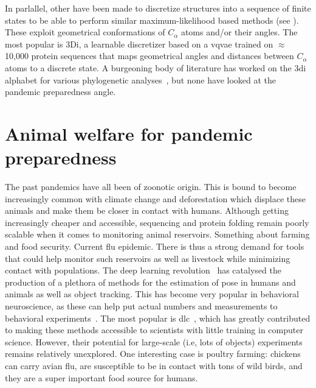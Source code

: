 In parlallel, other have been made to discretize structures into a sequence of finite states to be able to perform similar maximum-likelihood based methods (see ). These exploit geometrical conformations of $C_\alpha$ atoms and/or their angles. The most popular is 3Di, a learnable discretizer based on a \gls{vqvae} trained on $\approx$ 10,000 protein sequences that maps geometrical angles and distances between $C_\alpha$ atoms to a discrete state. A burgeoning body of literature has worked on the 3di alphabet for various phylogenetic analyses~\cite{moi2023, puente2023}, but none have looked at the pandemic preparedness angle.


\section{Animal welfare for pandemic preparedness}

The past pandemics have all been of zoonotic origin. This is bound to become increasingly common with climate change and deforestation which displace these animals and make them be closer in contact with humans. Although getting increasingly cheaper and accessible, sequencing and protein folding remain poorly scalable when it comes to monitoring animal reservoirs. Something about farming and food security. Current flu epidemic. There is thus a strong demand for tools that could help monitor such reservoirs as well as livestock while minimizing contact with populations. The deep learning revolution~\cite{lecun2015} has catalysed the production of a plethora of methods for the estimation of pose in humans and animals as well as object tracking. This has become very popular in behavioral neuroscience, as these can help put actual numbers and measurements to behavioral experiments~\cite{mathis2018, graving2019, gunel2019, pereira2022, lauer2022}. The most popular is \gls{dlc}~\cite{mathis2018}, which has greatly contributed to making these methods accessible to scientists with little training in computer science. However, their potential for large-scale (i.e, lots of objects) experiments remains relatively unexplored. One interesting case is poultry farming: chickens can carry avian flu, are susceptible to be in contact with tons of wild birds, and they are a super important food source for humans.

